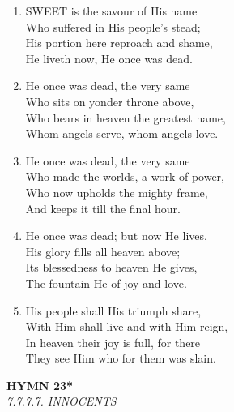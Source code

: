 \begin{enumerate}
    \item SWEET is the savour of His name \\
        Who suffered in His people's stead; \\
        His portion here reproach and shame, \\
        He liveth now, He once was dead.

    \item He once was dead, the very same \\
        Who sits on yonder throne above, \\
        Who bears in heaven the greatest name, \\
        Whom angels serve, whom angels love.

    \item He once was dead, the very same \\
        Who made the worlds, a work of power, \\
        Who now upholds the mighty frame, \\
        And keeps it till the final hour.

    \item He once was dead; but now He lives, \\
        His glory fills all heaven above; \\
        Its blessedness to heaven He gives, \\
        The fountain He of joy and love.

    \item His people shall His triumph share, \\
        With Him shall live and with Him reign, \\
        In heaven their joy is full, for there \\
        They see Him who for them was slain.

\end{enumerate}

\newpage
\begin{center}
    {\Large \textbf{HYMN 23*}}
    \\
    \textit{7.7.7.7. INNOCENTS}
\end{center}
\vspace{1em}

